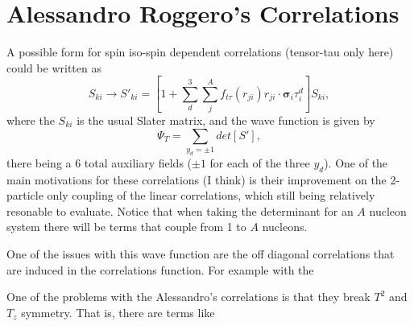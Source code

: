\section{Alessandro Roggero's Correlations}
A possible form for spin iso-spin dependent correlations (tensor-tau only here) could be written as
\begin{equation}
   S_{ki} \rightarrow S'_{ki} = \left[1+\sum\limits_d^3\sum\limits_j^A f_{t\tau}(r_{ji})\hat{r}_{ji}\cdot\mathbf{\sigma}_i\tau_i^d\right]S_{ki},
\end{equation}
where the $S_{ki}$ is the usual Slater matrix, and the wave function is given by
\begin{equation}
   \Psi_T = \sum\limits_{y_d=\pm1} det[S'],
\end{equation}
there being a 6 total auxiliary fields ($\pm1$ for each of the three $y_d$). One of the main motivations for these correlations (I think) is their improvement on the 2-particle only coupling of the linear correlations, which still being relatively resonable to evaluate. Notice that when taking the determinant for an $A$ nucleon system there will be terms that couple from 1 to $A$ nucleons.

One of the issues with this wave function are the off diagonal correlations that are induced in the correlations function. For example with the 

One of the problems with the Alessandro's correlations is that they break $T^2$ and $T_z$ symmetry. That is, there are terms like 

